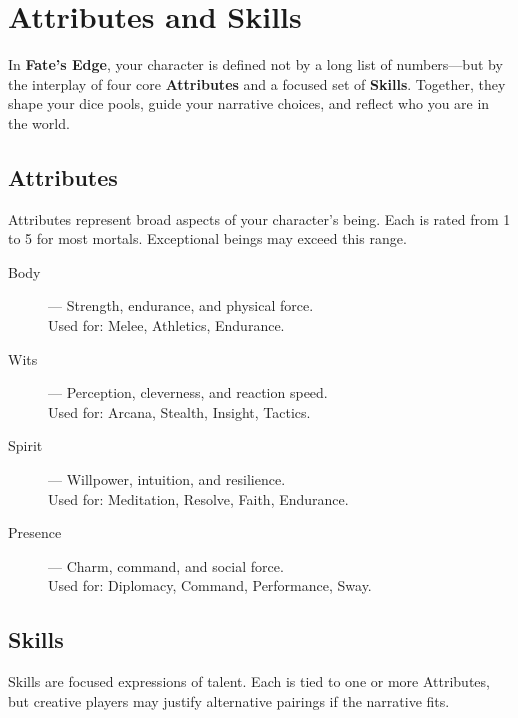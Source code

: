 
\chapter{Attributes and Skills}
\label{ch:attributes-skills}

In \textbf{Fate's Edge}, your character is defined not by a long list of numbers—but by the interplay of four core \textbf{Attributes} and a focused set of \textbf{Skills}. Together, they shape your dice pools, guide your narrative choices, and reflect who you are in the world.

\section{Attributes}

Attributes represent broad aspects of your character's being. Each is rated from 1 to 5 for most mortals. Exceptional beings may exceed this range.

\begin{description}
  \item[Body]  — Strength, endurance, and physical force. \\
    Used for: Melee, Athletics, Endurance.

  \item[Wits]  — Perception, cleverness, and reaction speed. \\
    Used for: Arcana, Stealth, Insight, Tactics.

  \item[Spirit]  — Willpower, intuition, and resilience. \\
    Used for: Meditation, Resolve, Faith, Endurance.

  \item[Presence]  — Charm, command, and social force. \\
    Used for: Diplomacy, Command, Performance, Sway.
\end{description}

\section{Skills}

Skills are focused expressions of talent. Each is tied to one or more Attributes, but creative players may justify alternative pairings if the narrative fits.

